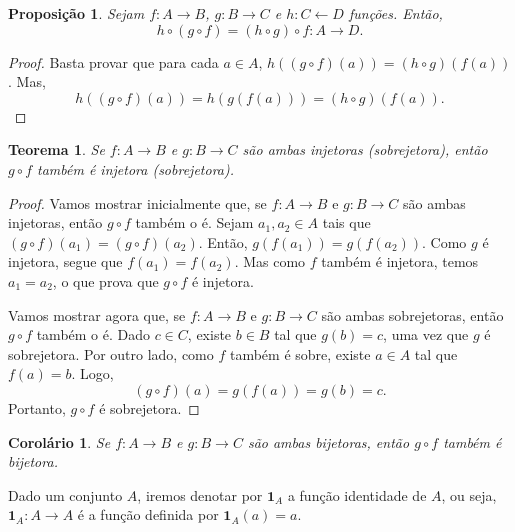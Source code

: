 \documentclass[a4paper,12pt]{monografia}
\theoremstyle{plain}
\newtheorem{theorem}{Teorema}[section]
\newtheorem{corollary}{Corolário}[section]
\newtheorem{proposition}{Proposição}[section]
\theoremstyle{definition}
\theoremstyle{remark}
\newcommand{\id}{\mathbf{1}}
\begin{document}
\begin{proposition}
Sejam $f:A\rightarrow B$, $g:B \rightarrow C$ e $h:C\leftarrow D$
funções. Então,
$$
h\circ(g \circ f)=(h \circ g)\circ f:A \rightarrow D.
$$
\end{proposition}
\begin{proof}
Basta provar que para cada $a \in A$, $h((g \circ f)(a))=(h \circ
g)(f(a))$. Mas,
$$
h((g \circ f)(a))=h(g(f(a)))=(h \circ g)(f(a)).
$$
\end{proof}
\begin{theorem}
Se $f:A \rightarrow B$ e $g:B \rightarrow C$ são ambas injetoras
(sobrejetora), então $g \circ f$ também é injetora (sobrejetora).
\end{theorem}
\begin{proof}
Vamos mostrar inicialmente que, se $f:A \rightarrow B$ e $g:B
\rightarrow C$ são ambas injetoras, então $g \circ f$ também o é.
Sejam $a_1, a_2 \in A$ tais que $(g \circ f)(a_1)=(g \circ
f)(a_2)$. Então, $g(f(a_1))=g(f(a_2))$. Como $g$ é injetora, segue
que $f(a_1)=f(a_2)$. Mas como $f$ também é injetora, temos
$a_1=a_2$, o que prova que $g \circ f$ é injetora.

Vamos mostrar agora que, se $f:A \rightarrow B$ e $g:B \rightarrow
C$ são ambas sobrejetoras, então $g \circ f$ também o é. Dado $c
\in C$, existe $b \in B$ tal que $g(b)=c$, uma vez que $g$ é
sobrejetora. Por outro lado, como $f$ também é sobre, existe $a \in A$
tal que $f(a)=b$. Logo,
$$
(g \circ f)(a)=g(f(a))=g(b)=c.
$$
Portanto, $g \circ f$ é sobrejetora.
\end{proof}
\begin{corollary}\label{comp-bi}
Se $f:A \rightarrow B$ e $g:B \rightarrow C$ são ambas bijetoras,
então $g \circ f$ também é bijetora.
\end{corollary}

Dado um conjunto $A$, iremos denotar por $\id_A$ a função
identidade de $A$, ou seja, $\id_A:A \rightarrow A$ é a função
definida por $\id_A(a)=a$.
\end{document}

